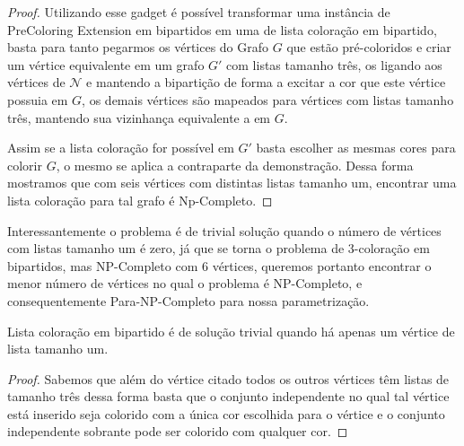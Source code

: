 \begin{proof}
Utilizando esse gadget é possível transformar uma instância de PreColoring Extension em bipartidos em uma de lista coloração em bipartido, basta para tanto pegarmos os vértices do Grafo $G$ que estão pré-coloridos e criar um vértice equivalente em um grafo $G'$ com listas tamanho três, os ligando aos vértices de $\mathcal{N}$ e mantendo a bipartição de forma a excitar a cor que este vértice possuia em $G$, os demais vértices são mapeados para vértices com listas tamanho três, mantendo sua vizinhança equivalente a em $G$.

Assim se a lista coloração for possível em $G'$ basta escolher as mesmas cores para colorir $G$, o mesmo se aplica a contraparte da demonstração. Dessa forma mostramos que com seis vértices com distintas listas tamanho um, encontrar uma lista coloração para tal grafo é Np-Completo. 

\end{proof}

Interessantemente o problema é de trivial solução quando o número de vértices com listas tamanho um é zero, já que se torna o problema de 3-coloração em bipartidos, mas NP-Completo com 6 vértices, queremos portanto encontrar o menor número de vértices no qual o problema é NP-Completo, e consequentemente Para-NP-Completo para nossa parametrização.

\begin{teorema}
\label{lemma:1-col-P}
 Lista coloração em bipartido é de solução trivial quando há apenas um vértice de lista tamanho um.
\end{teorema}
\begin{proof}
 Sabemos que além do vértice citado todos os outros vértices têm listas de tamanho três dessa forma basta que o conjunto independente no qual tal vértice está inserido seja colorido com a única cor escolhida para o vértice e o conjunto independente sobrante pode ser colorido com qualquer cor.
\end{proof}

